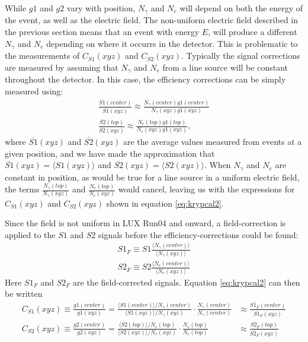While $g1$ and $g2$ vary with position, $N_{\gamma}$ and $N_e$ will depend on both the energy of the event, as well as the electric field. The non-uniform electric field described in the previous section means that an event with energy $E$, will produce a different $N_{\gamma}$ and $N_{e}$ depending on where it occurrs in the detector. This is problematic to the measurements of $C_{S1}(xyz)$ and $C_{S2}(xyz)$. Typically the signal corrections are measured by assuming that $N_{\gamma}$ and $N_{e}$ from a line source will be constant throughout the detector. In this case, the efficiency corrections can be simply measured using:
\begin{equation}\label{eq:krypcal3}
\begin{split}
\frac{\overline{S1}(center)}{\overline{S1}(xyz)}\approx \frac{N_{\gamma}(center)g1(center)}{N_{\gamma}(xyz)g1(xyz)}\\[1em]
\frac{\overline{S2}(top)}{\overline{S2}(xyz)}\approx \frac{N_{e}(top)g1(top)}{N_{e}(xyz)g1(xyz)},
\end{split}
\end{equation}
where $\overline{S1}(xyz)$ and $\overline{S2}(xyz)$ are the average values measured from events at a given position, and we have made the approximation that $\overline{S1}(xyz)=\langle S1(xyz) \rangle$ and $\overline{S2}(xyz)=\langle S2(xyz) \rangle$. When $N_{\gamma}$ and $N_e$ are constant in position, as would be true for a line source in a uniform electric field, the terms $\frac{N_{\gamma}(top)}{N_{\gamma}(xyz)}$ and $\frac{N_{e}(top)}{N_{e}(xyz)}$ would cancel, leaving us with the expressions for $C_{S1}(xyz)$ and $C_{S2}(xyz)$ shown in equation \ref{eq:krypcal2}. 

Since the field is not uniform in LUX Run04 and onward, a field-correction is applied to the $S1$ and $S2$ signals before the efficiency-corrections could be found:
\begin{equation}\label{eq:krypcal4}
\begin{split}
S1_F\equiv S1 \frac{\langle N_{\gamma}(center) \rangle}{\langle N_{\gamma}(xyz)\rangle}\\[1em]
S2_F\equiv S2 \frac{\langle N_{e}(center)\rangle}{\langle N_{e}(xyz)\rangle}
\end{split}
\end{equation}
Here $S1_F$ and $S2_F$ are the field-corrected signals. Equation \ref{eq:krypcal2} can then be written
\begin{equation}\label{eq:krypcal5}
\begin{split}
C_{S1}(xyz) \equiv \frac{g1(center)}{g1(xyz)}=\frac{\langle S1(center) \rangle / N_{\gamma}(center)}{\langle S1(xyz) \rangle / N_{\gamma}(xyz)}\cdot \frac{N_{\gamma}(center)}{N_{\gamma}(center)} &\approx \frac{\overline{S1_F}(center)}{\overline{S1_F}(xyz)}\\[1em]
C_{S2}(xyz) \equiv \frac{g2(center)}{g2(xyz)}=\frac{\langle S2(top) \rangle / N_{e}(top)}{\langle S2(xyz) \rangle / N_{e}(xyz)} \cdot \frac{N_{e}(top)}{N_{e}(top)} &\approx \frac{\overline{S2_F}(top)}{\overline{S2_F}(xyz)}
\end{split}
\end{equation}


